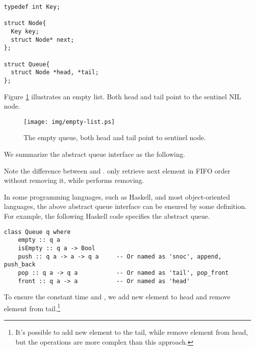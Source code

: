 \documentclass{article}
\begin{document}
\lstset{language=C}
\begin{lstlisting}
typedef int Key;

struct Node{
  Key key;
  struct Node* next;
};

struct Queue{
  struct Node *head, *tail;
};
\end{lstlisting}

Figure \ref{fig:empty-list} illustrates an empty list. Both head
and tail point to the sentinel NIL node.

\begin{figure}[htbp]
  \centering
  \texttt{[image: img/empty-list.ps]}
  \caption{The empty queue, both head and tail point to sentinel node.} \label{fig:empty-list}
\end{figure}

We summarize the abstract queue interface as the following.

\begin{algorithmic}
\EndFunction
{}
\EndFunction
{}
\EndFunction
{}
\EndFunction
{}
\EndFunction
\end{algorithmic}

Note the difference between  and .
 only retrieve next element in FIFO order without removing
it, while  performs removing.

In some programming languages, such as Haskell, and most object-oriented
languages, the above abstract queue interface can be ensured by some definition.
For example, the following Haskell code specifies the abstract queue.

\lstset{language=Haskell}
\begin{lstlisting}
class Queue q where
    empty :: q a
    isEmpty :: q a -> Bool
    push :: q a -> a -> q a     -- Or named as 'snoc', append, push_back
    pop :: q a -> q a           -- Or named as 'tail', pop_front
    front :: q a -> a           -- Or named as 'head'
\end{lstlisting}

To ensure the constant time  and ,
we add new element to head and remove element from tail.\footnote{It's possible
to add new element to the tail, while remove element from head, but the
operations are more complex than this approach.}
\end{document}
